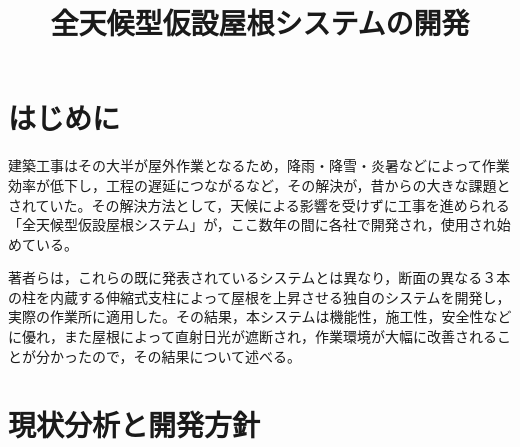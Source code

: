 \documentclass[8pt,twocolumn]{jsarticle}
\title{全天候型仮設屋根システムの開発}
{DEVELOPMENET OF ALL WEATHERS TEMPORARY ROOF SYSTEM WITH TELESCOPIC SUPPORTS}
\begin{document}
\maketitle
\makefooter

\section{はじめに}
建築工事はその大半が屋外作業となるため，降雨・降雪・炎暑などによって作業効率が低下し，工程の遅延につながるなど，その解決が，昔からの大きな課題とされていた。その解決方法として，天候による影響を受けずに工事を進められる「全天候型仮設屋根システム」が，ここ数年の間に各社で開発され，使用され始めている。

著者らは，これらの既に発表されているシステムとは異なり，断面の異なる３本の柱を内蔵する伸縮式支柱によって屋根を上昇させる独自のシステムを開発し，実際の作業所に適用した。その結果，本システムは機能性，施工性，安全性などに優れ，また屋根によって直射日光が遮断され，作業環境が大幅に改善されることが分かったので，その結果について述べる。
\cite{AutoBuildingSystem}\cite{ParadigmShift}\cite{Kimura1994}

\section{現状分析と開発方針}

\printbibliography[title=参考文献]
\end{document}
